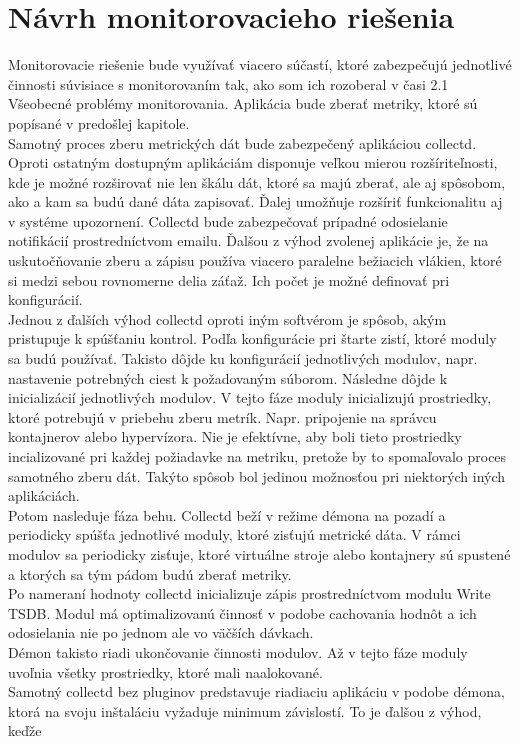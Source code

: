 \documentclass[11pt,final,oneside]{fithesis}
\begin{document}
\section{Návrh monitorovacieho riešenia}
Monitorovacie riešenie bude využívať viacero súčastí, ktoré zabezpečujú jednotlivé činnosti súvisiace s monitorovaním tak, ako som ich rozoberal v časi 2.1 Všeobecné problémy monitorovania.
Aplikácia bude zberať metriky, ktoré sú popísané v predošlej kapitole. 
\\Samotný proces zberu metrických dát bude zabezpečený aplikáciou collectd. Oproti ostatným dostupným aplikáciám disponuje
veľkou mierou rozšíriteľnosti, kde je možné rozširovať nie len škálu dát, ktoré sa majú zberať, ale aj spôsobom, ako a kam sa budú dané dáta zapisovať. Ďalej umožňuje rozšíriť funkcionalitu
aj v systéme upozornení. Collectd bude zabezpečovať prípadné odosielanie notifikácií prostredníctvom emailu. Ďalšou z výhod zvolenej aplikácie je, že na uskutočňovanie zberu a zápisu používa viacero
paralelne bežiacich vlákien, ktoré si medzi sebou rovnomerne delia záťaž. Ich počet je možné definovať pri konfigurácií. 
\\Jednou z ďalších výhod collectd oproti iným softvérom je spôsob, akým pristupuje k spúšťaniu kontrol. Podľa konfigurácie pri štarte zistí, ktoré moduly sa budú používať. Takisto dôjde ku konfigurácií 
jednotlivých modulov, napr. nastavenie potrebných ciest k požadovaným súborom. Následne dôjde k inicializácií jednotlivých modulov. V tejto fáze moduly inicializujú prostriedky, ktoré potrebujú v priebehu 
zberu metrík. Napr. pripojenie na správcu kontajnerov alebo hypervízora. Nie je efektívne, aby boli tieto prostriedky incializované pri
každej požiadavke na metriku, pretože by to spomaľovalo proces samotného zberu dát. Takýto spôsob bol jedinou možnosťou pri niektorých iných aplikáciách.
\\Potom nasleduje fáza behu. Collectd beží v režime démona na pozadí a periodicky spúšťa jednotlivé moduly, ktoré zisťujú metrické dáta. 
V rámci modulov sa periodicky zisťuje, ktoré virtuálne stroje alebo kontajnery sú spustené a ktorých sa tým pádom budú zberať metriky. 
\\Po nameraní hodnoty collectd inicializuje zápis prostredníctvom modulu Write TSDB. Modul má optimalizovanú činnosť v podobe cachovania
hodnôt a ich odosielania nie po jednom ale vo väčších dávkach.
\\Démon takisto riadi ukončovanie činnosti modulov. Až v tejto fáze moduly uvoľnia všetky prostriedky, ktoré mali naalokované.
\\Samotný collectd bez pluginov predstavuje riadiaciu aplikáciu v podobe démona, ktorá na svoju inštaláciu vyžaduje minimum závislostí. To je ďalšou z výhod, keďže 
\end{document}
